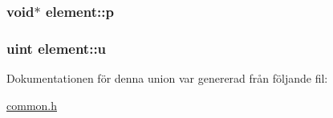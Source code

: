 \subsubsection[{\texorpdfstring{p}{p}}]{\setlength{\rightskip}{0pt plus 5cm}void$\ast$ element\+::p}\hypertarget{unionelement_a075c65aee9ffc316eb213e9d0606e0b9}{}\label{unionelement_a075c65aee9ffc316eb213e9d0606e0b9}
\subsubsection[{\texorpdfstring{u}{u}}]{\setlength{\rightskip}{0pt plus 5cm}uint element\+::u}\hypertarget{unionelement_abd4034f37eb6d6ecdda71c9102680902}{}\label{unionelement_abd4034f37eb6d6ecdda71c9102680902}


Dokumentationen för denna union var genererad från följande fil\+:\begin{DoxyCompactItemize}
\item 
\hyperlink{common_8h}{common.\+h}\end{DoxyCompactItemize}
